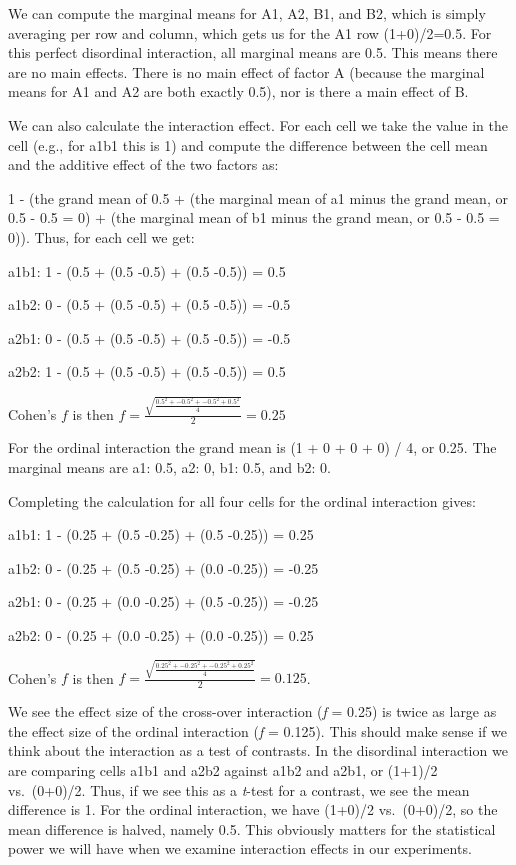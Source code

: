 \documentclass[
  oneside]{book}
\begin{document}
We can compute the marginal means for A1, A2, B1, and B2, which is simply averaging per row and column, which gets us for the A1 row (1+0)/2=0.5. For this perfect disordinal interaction, all marginal means are 0.5. This means there are no main effects. There is no main effect of factor A (because the marginal means for A1 and A2 are both exactly 0.5), nor is there a main effect of B.

We can also calculate the interaction effect. For each cell we take the value in the cell (e.g., for a1b1 this is 1) and compute the difference between the cell mean and the additive effect of the two factors as:

1 - (the grand mean of 0.5 + (the marginal mean of a1 minus the grand mean, or 0.5 - 0.5 = 0) + (the marginal mean of b1 minus the grand mean, or 0.5 - 0.5 = 0)). Thus, for each cell we get:

a1b1: 1 - (0.5 + (0.5 -0.5) + (0.5 -0.5)) = 0.5

a1b2: 0 - (0.5 + (0.5 -0.5) + (0.5 -0.5)) = -0.5

a2b1: 0 - (0.5 + (0.5 -0.5) + (0.5 -0.5)) = -0.5

a2b2: 1 - (0.5 + (0.5 -0.5) + (0.5 -0.5)) = 0.5

Cohen's \(f\) is then \(f = \frac { \sqrt { \frac { 0.5^2 +-0.5^2 + -0.5^2 + 0.5^2 } { 4 } }}{ 2 } = 0.25\)

For the ordinal interaction the grand mean is (1 + 0 + 0 + 0) / 4, or 0.25. The marginal means are a1: 0.5, a2: 0, b1: 0.5, and b2: 0.

Completing the calculation for all four cells for the ordinal interaction gives:

a1b1: 1 - (0.25 + (0.5 -0.25) + (0.5 -0.25)) = 0.25

a1b2: 0 - (0.25 + (0.5 -0.25) + (0.0 -0.25)) = -0.25

a2b1: 0 - (0.25 + (0.0 -0.25) + (0.5 -0.25)) = -0.25

a2b2: 0 - (0.25 + (0.0 -0.25) + (0.0 -0.25)) = 0.25

Cohen's \(f\) is then \(f = \frac { \sqrt { \frac { 0.25^2 +-0.25^2 + -0.25^2 + 0.25^2 } { 4 } }}{ 2 } = 0.125\).

We see the effect size of the cross-over interaction (\emph{f} = 0.25) is twice as large as the effect size of the ordinal interaction (\emph{f} = 0.125). This should make sense if we think about the interaction as a test of contrasts. In the disordinal interaction we are comparing cells a1b1 and a2b2 against a1b2 and a2b1, or (1+1)/2 vs.~(0+0)/2. Thus, if we see this as a \emph{t}-test for a contrast, we see the mean difference is 1. For the ordinal interaction, we have (1+0)/2 vs.~(0+0)/2, so the mean difference is halved, namely 0.5. This obviously matters for the statistical power we will have when we examine interaction effects in our experiments.
\end{document}

